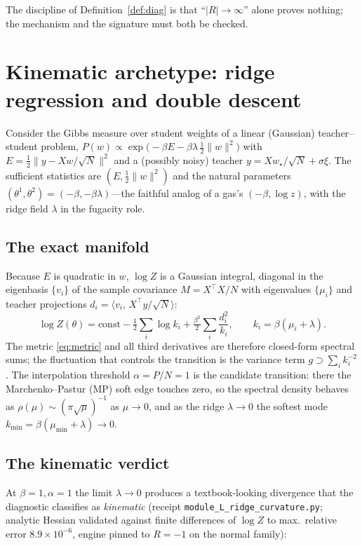 \documentclass[a4paper,11pt]{article}
\theoremstyle{plain}
\theoremstyle{definition}
\theoremstyle{remark}
\newcommand{\Ric}{R}
\begin{document}
The discipline of Definition~\ref{def:diag} is that ``$|\Ric|\to\infty$'' alone proves nothing; the
mechanism and the signature must both be checked.

\section{Kinematic archetype: ridge regression and double descent}\label{sec:ridge}
Consider the Gibbs measure over student weights of a linear (Gaussian) teacher--student problem,
$P(w)\propto\exp\!\big(-\beta E-\beta\lambda\,\tfrac12\|w\|^2\big)$ with $E=\tfrac12\|y-Xw/\sqrt N\|^2$ and a
(possibly noisy) teacher $y=Xw_\star/\sqrt N+\sigma\xi$. The sufficient statistics are $(E,\tfrac12\|w\|^2)$
and the natural parameters $(\theta^1,\theta^2)=(-\beta,-\beta\lambda)$---the faithful analog of a gas's
$(-\beta,\log z)$, with the ridge field $\lambda$ in the fugacity role.

\subsection{The exact manifold}\label{sec:ridge-manifold}
Because $E$ is quadratic in $w$, $\log Z$ is a Gaussian integral, diagonal in the eigenbasis $\{v_i\}$ of the
sample covariance $M=X^\top X/N$ with eigenvalues $\{\mu_i\}$ and teacher projections
$d_i=\langle v_i,\,X^\top y/\sqrt N\rangle$:
\begin{equation}
\log Z(\theta)=\mathrm{const}-\tfrac12\textstyle\sum_i\log k_i+\tfrac{\beta^2}{2}\sum_i\frac{d_i^2}{k_i},
\qquad k_i=\beta(\mu_i+\lambda).
\label{eq:ridgeZ}
\end{equation}
The metric \eqref{eq:metric} and all third derivatives are therefore closed-form spectral sums; the
fluctuation that controls the transition is the variance term $g\supset\sum_i k_i^{-2}$. The interpolation
threshold $\alpha=P/N=1$ is the candidate transition: there the Marchenko--Pastur (MP) soft edge touches
zero, so the spectral density behaves as $\rho(\mu)\sim(\pi\sqrt\mu)^{-1}$ as $\mu\to0$, and as the ridge
$\lambda\to0$ the softest mode $k_{\min}=\beta(\mu_{\min}+\lambda)\to0$.

\subsection{The kinematic verdict}\label{sec:ridge-verdict}
At $\beta=1,\alpha=1$ the limit $\lambda\to0$ produces a textbook-looking divergence that the diagnostic
classifies as \emph{kinematic} (receipt \texttt{module\_L\_ridge\_curvature.py}; analytic Hessian validated
against finite differences of $\log Z$ to max.\ relative error $8.9\times10^{-6}$, engine pinned to
$\Ric=-1$ on the normal family):
\end{document}
